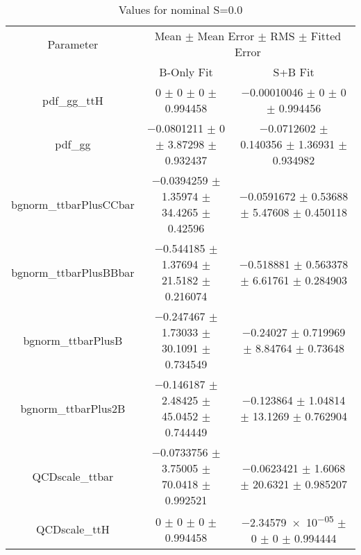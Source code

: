 \begin{table}
\centering
\caption{Values for nominal S=0.0}
\begin{tabular}{ccc}
\toprule
Parameter & \multicolumn{2}{c}{Mean $\pm$ Mean Error $\pm$ RMS $\pm$ Fitted Error}\\
 & B-Only Fit & S+B Fit\\
\midrule
pdf\_gg\_ttH & \num{0} $\pm$ \num{0} $\pm$ \num{0} $\pm$ \num{0.994458} & \num{-0.00010046} $\pm$ \num{0} $\pm$ \num{0} $\pm$ \num{0.994456}\\
pdf\_gg & \num{-0.0801211} $\pm$ \num{0} $\pm$ \num{3.87298} $\pm$ \num{0.932437} & \num{-0.0712602} $\pm$ \num{0.140356} $\pm$ \num{1.36931} $\pm$ \num{0.934982}\\
bgnorm\_ttbarPlusCCbar & \num{-0.0394259} $\pm$ \num{1.35974} $\pm$ \num{34.4265} $\pm$ \num{0.42596} & \num{-0.0591672} $\pm$ \num{0.53688} $\pm$ \num{5.47608} $\pm$ \num{0.450118}\\
bgnorm\_ttbarPlusBBbar & \num{-0.544185} $\pm$ \num{1.37694} $\pm$ \num{21.5182} $\pm$ \num{0.216074} & \num{-0.518881} $\pm$ \num{0.563378} $\pm$ \num{6.61761} $\pm$ \num{0.284903}\\
bgnorm\_ttbarPlusB & \num{-0.247467} $\pm$ \num{1.73033} $\pm$ \num{30.1091} $\pm$ \num{0.734549} & \num{-0.24027} $\pm$ \num{0.719969} $\pm$ \num{8.84764} $\pm$ \num{0.73648}\\
bgnorm\_ttbarPlus2B & \num{-0.146187} $\pm$ \num{2.48425} $\pm$ \num{45.0452} $\pm$ \num{0.744449} & \num{-0.123864} $\pm$ \num{1.04814} $\pm$ \num{13.1269} $\pm$ \num{0.762904}\\
QCDscale\_ttbar & \num{-0.0733756} $\pm$ \num{3.75005} $\pm$ \num{70.0418} $\pm$ \num{0.992521} & \num{-0.0623421} $\pm$ \num{1.6068} $\pm$ \num{20.6321} $\pm$ \num{0.985207}\\
QCDscale\_ttH & \num{0} $\pm$ \num{0} $\pm$ \num{0} $\pm$ \num{0.994458} & \num{-2.34579e-05} $\pm$ \num{0} $\pm$ \num{0} $\pm$ \num{0.994444}\\
\bottomrule
\end{tabular}
\end{table}